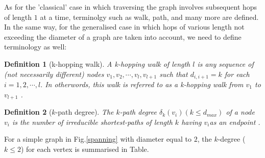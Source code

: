\documentclass[10pt,a4paper]{article}
\newtheorem{defn}{Definition}
\begin{document}
    	    As for the 'classical' case in which traversing the graph involves subsequent hops of length $1$ at a time, terminolgy such as walk, path, and many more are defined. In the same way, for the generalised case in which hops of various length not exceeding the diameter of a graph are taken into account,  we need to define terminology as well:\\
    	    \begin{defn}[k-hopping walk]
    	    	A k-hopping walk of length $l$ is any sequence of (not necessarily different) nodes $v_1,v_2, \cdots,v_l, v_{l+1}$ such that $d_{i,i+1} = k$ for each $i=1,2, \cdots, l.$ In otherwords, this walk is referred to as a k-hopping walk from $v_1$ to $v_{l+1}$ \citep{estrada2012path}.\\ 
    	    \end{defn}
    	    
    	    
    	    \begin{defn}[$k$-path degree]
    	    	The $k$-path degree $\delta_k(v_i)(k\leq d_{max})$ of a node $v_i$ is the number of irreducible shortest-paths of length $k$ having $v_i$as an endpoint \citep{estrada2012path}. \\
    	    \end{defn}
            For a simple graph in Fig.\ref{spanning} with diameter equal to $2$, the $k$-degree ($k\leq 2 $) for each vertex is summarised in Table.
           
\end{document}
